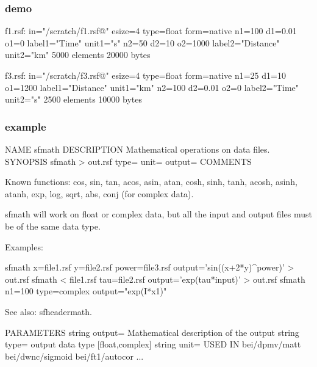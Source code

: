 \begin{frame}[fragile] \frametitle{demo}


  \vfill
\tiny
\begin{semiverbatim}
f1.rsf:
    in="/scratch/f1.rsf@"
    esize=4 type=float form=native
    n1=100         d1=0.01        o1=0          label1="Time" unit1="s"
    n2=50          d2=10          o2=1000       label2="Distance" unit2="km"
        5000 elements 20000 bytes
\end{semiverbatim}
\large

  \vfill
\tiny
\begin{semiverbatim}
f3.rsf:
    in="/scratch/f3.rsf@"
    esize=4 type=float form=native
    n1=25          d1=10          o1=1200       label1="Distance" unit1="km"
    n2=100         d2=0.01        o2=0          label2="Time" unit2="s"
        2500 elements 10000 bytes
\end{semiverbatim}
\end{frame}
\cwpnote{}

\begin{frame}
\end{frame}
\cwpnote{}


\begin{frame}[fragile] \frametitle{example}

  \tiny
\begin{semiverbatim}
NAME
        sfmath
DESCRIPTION
        Mathematical operations on data files.
SYNOPSIS
        sfmath > out.rsf type= unit= output=
COMMENTS

        Known functions: cos,  sin,  tan,  acos,  asin,  atan,
                         cosh, sinh, tanh, acosh, asinh, atanh,
                         exp,  log,  sqrt, abs, conj (for complex data).

        sfmath will work on float or complex data, but all the input and output
        files must be of the same data type.

        Examples:

        sfmath x=file1.rsf y=file2.rsf power=file3.rsf output='sin((x+2*y)^power)' > out.rsf
        sfmath < file1.rsf tau=file2.rsf output='exp(tau*input)' > out.rsf
        sfmath n1=100 type=complex output="exp(I*x1)"

        See also: sfheadermath.

PARAMETERS
        string  output=         Mathematical description of the output
        string  type=   output data type [float,complex]
        string  unit=
USED IN
        bei/dpmv/matt
        bei/dwnc/sigmoid
        bei/ft1/autocor
	...
\end{semiverbatim}
\end{frame}
\cwpnote{}

